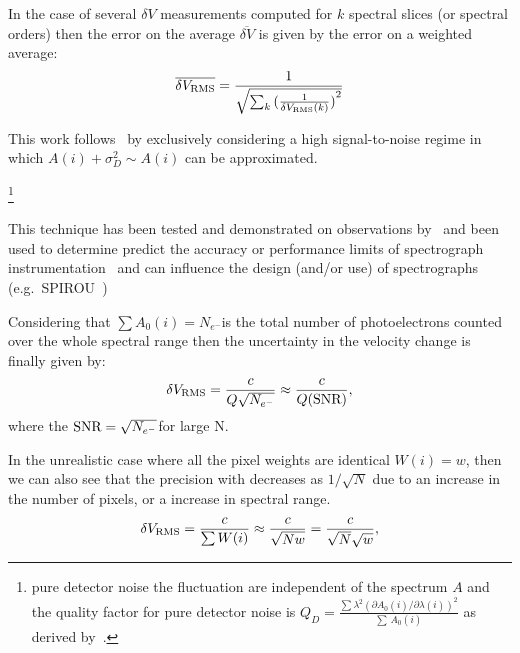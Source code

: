 In the case of several \(\delta V\) measurements computed for \(k\) spectral slices (or spectral orders) then the error on the average \(\overline{\delta V}\) is given by the error on a weighted average:
\begin{equation}
\overline{\delta {V}_{\textrm{RMS}}} = \frac{1}{\sqrt{\sum_k{{(\frac{1}{\delta V_{\textrm{RMS}}(k)})}^{2}}}}  \label{eqn:weighted_average_error}
\end{equation}

This work follows~\cite{figueira_radial_2016} by exclusively considering a high signal-to-noise regime in which \({A(i) + \sigma_{D}^{2}} \sim {A(i)}\) can be approximated.


\footnote{pure detector noise the fluctuation are independent of the spectrum \(A\) and the quality factor for pure detector noise is \(Q_D = \frac{\sum{{\lambda}^{2} {(\partial A_0(i)/\partial \lambda(i))}^{2}}}{\sum{\, A_0(i)}}\) as derived by~\cite{connes_absolute_1985}.}


This technique has been tested and demonstrated on observations by~\citet{connes_demonstration_1996} and been used to determine predict the accuracy or performance limits of spectrograph instrumentation~\citep[e.g.][]{connes_absolute_1985,bouchy_fundamental_2001} and can influence the design (and/or use) of spectrographs
 (e.g.\ SPIROU~\citep{artigau_spirou_2014,figueira_radial_2016})


Considering that \(\sum{A_0(i)} = N_{{e}^{-}}\)is the total number of photoelectrons counted over the whole spectral range then the uncertainty in the velocity change is finally given by:
\begin{equation}
\delta V_{\textrm{RMS}} = \frac{c}{Q \sqrt{N_{{e}^{-}}}} \approx \frac{c}{Q (\textrm{SNR}{})}, \label{eqn:rv_SNR}
\end{equation}
where the \(\textrm{SNR}{}=\sqrt{N_{{e}^{-}}}\)for large N.


In the unrealistic case where all the pixel weights are identical $W(i)=w$, then we can also see that the precision with decreases as $1/\sqrt{N}$ due to an increase in the number of pixels, or a increase in spectral range.
 \begin{equation}
 \delta V_{\textrm{RMS}} = \frac{c}{\sum{W(i)}} \approx \frac{c}{\sqrt{N w}}=  \frac{c}{\sqrt{N}\sqrt{w}}, \label{eqn:sqrtN}
 \end{equation}

